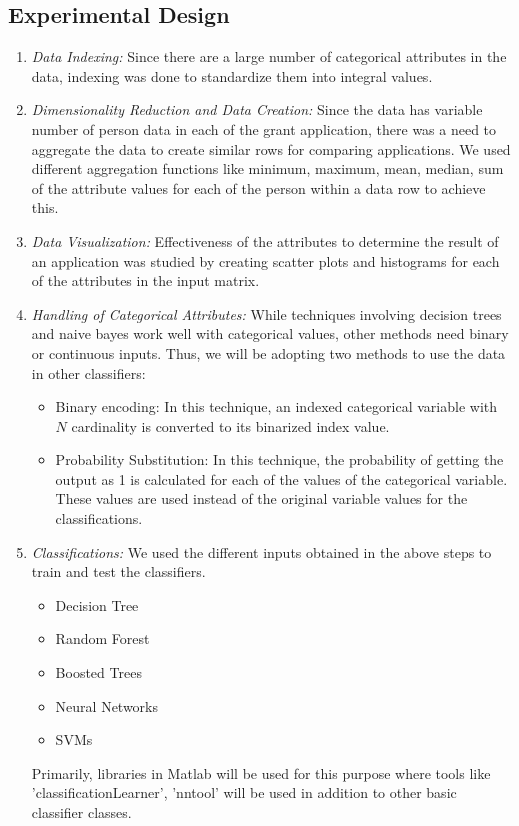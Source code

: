 \documentclass{article} %
\begin{document}
	\subsection{Experimental Design}
	\begin{enumerate}
		\item \emph{Data Indexing:} Since there are a large number of categorical attributes in the data, indexing was done to standardize them into integral values.
		\item \emph{Dimensionality Reduction and Data Creation:} Since the data has variable number of person data in each of the grant application, there was a need to aggregate the data to create similar rows for comparing applications. We used different aggregation functions like minimum, maximum, mean, median, sum of the attribute values for each of the person within a data row\cite{OneRow} to achieve this.
		\item \emph{Data Visualization:} Effectiveness of the attributes to determine the result of an application was studied by creating scatter plots and histograms for each of the attributes in the input matrix. 
		\item \emph{Handling of Categorical Attributes:} While techniques involving decision trees and naive bayes work well with categorical values, other methods need binary or continuous inputs. Thus, we will be adopting two methods to use the data in other classifiers:
		
		\begin{itemize}
			\item Binary encoding: In this technique, an indexed categorical variable with $N$ cardinality is converted to its binarized index value. 
			\item Probability Substitution: In this technique, the probability of getting the output as 1 is calculated for each of the values of the categorical variable. These values are used instead of the original variable values for the classifications.  \cite{HighCard}
		\end{itemize}  
		
		
		\item \emph{Classifications:} We used the different inputs obtained in the above steps to train and test the classifiers.
		\begin{itemize}
			\item Decision Tree
			\item Random Forest
			\item Boosted Trees
			\item Neural Networks
			\item SVMs
		\end{itemize}
		Primarily, libraries in Matlab will be used for this purpose where tools like 'classificationLearner', 'nntool' will be used in addition to other basic classifier classes.
		

\end{enumerate}
\end{document}
